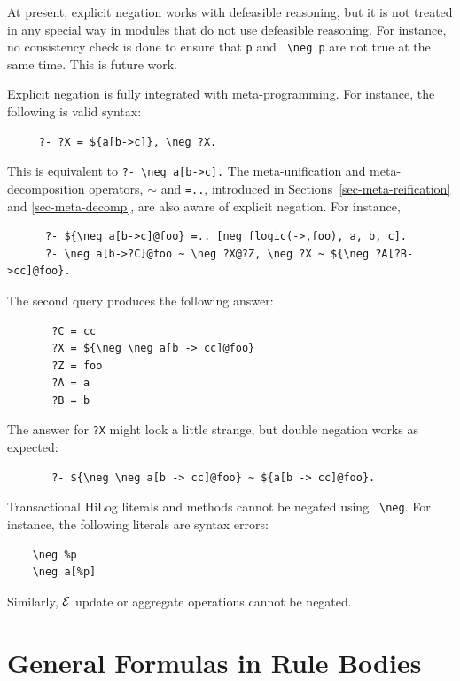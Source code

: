 \documentclass[11pt]{article}
\newcommand{\ERGO}{\mbox{\ensuremath{\cal{E}}\smaller{{\sc{RGO}}}}\xspace}
\newcommand{\FLSYSTEM}{\ERGO}
\newcommand{\bs}{\textbackslash}
\newcommand{\RULELOGNEG}{{\texttt{{\bs}neg}}\xspace}
\begin{document}
At present, explicit negation works with defeasible reasoning, but it is
not treated in any special way in modules that do not use defeasible reasoning.
For instance, no consistency check is done to ensure that {\tt p} and {\tt
  \RULELOGNEG p} are not true at the same time. This is future work.

Explicit negation is fully integrated with meta-programming. For instance,
the following is valid syntax:
\begin{verbatim}
     ?- ?X = ${a[b->c]}, \neg ?X.
\end{verbatim}
This is equivalent to \verb|?- \neg a[b->c].|  The meta-unification and
meta-decomposition operators, {\tt $\sim$} and {\tt =..}, introduced in
Sections~\ref{sec-meta-reification} and \ref{sec-meta-decomp}, are
also aware of explicit negation. For instance, 
\begin{verbatim}
      ?- ${\neg a[b->c]@foo} =.. [neg_flogic(->,foo), a, b, c].
      ?- \neg a[b->?C]@foo ~ \neg ?X@?Z, \neg ?X ~ ${\neg ?A[?B->cc]@foo}.
\end{verbatim}
The second query produces the following answer:
\begin{verbatim}
       ?C = cc
       ?X = ${\neg \neg a[b -> cc]@foo}
       ?Z = foo
       ?A = a
       ?B = b
\end{verbatim}
The answer for {\tt ?X} might look a little strange, but double negation
works as expected:
\begin{verbatim}
       ?- ${\neg \neg a[b -> cc]@foo} ~ ${a[b -> cc]@foo}.
\end{verbatim}

Transactional HiLog literals and methods cannot be negated using {\tt
  \RULELOGNEG}. For instance, the following literals are syntax errors:
\begin{verbatim}
    \neg %p
    \neg a[%p]
\end{verbatim}
Similarly, \FLSYSTEM update or aggregate operations cannot be negated.


\section{General Formulas in Rule Bodies}\label{sec-lt}
\end{document}
